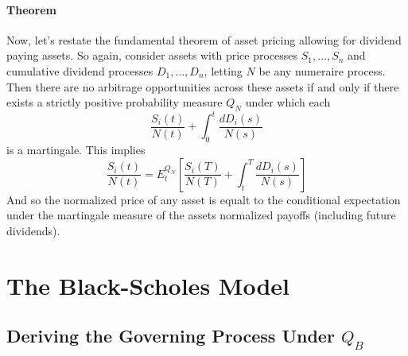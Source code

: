 \documentclass[12pt]{article}
\theoremstyle{plain}
\theoremstyle{definition}
\theoremstyle{remark}
\begin{document}
\paragraph{Theorem} Now, let's restate the fundamental theorem of asset
pricing allowing for dividend paying assets.  So again, consider
assets with price processes $S_1, \ldots, S_n$ and cumulative dividend
processes $D_1,\ldots,D_n$, letting $N$ be any numeraire process.
Then there are no arbitrage opportunities across these assets if and
only if there exists a strictly positive probability measure $Q_N$ 
under which each
   \[ \frac{S_i(t)}{N(t)} + \int^t_0 \frac{dD_i(s)}{N(s)} \]
is a martingale. This implies
\[ \frac{S_i(t)}{N(t)}  = E_t^{Q_N}\left[ \frac{S_i(T)}{N(T)} +
   \int^T_t \frac{dD_i(s)}{N(s)}\right] \]
And so the normalized price of any asset is equalt to the conditional
expectation under the martingale measure of the assets normalized payoffs
(including future dividends).



\newpage


\section{The Black-Scholes Model}

\subsection{Deriving the Governing Process Under $Q_B$}
\end{document}
